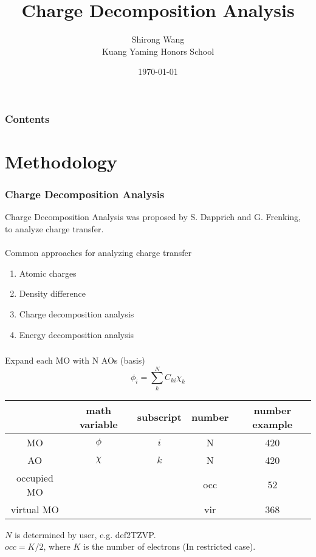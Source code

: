 \documentclass[10pt,aspectratio=43]{beamer}
\title{Charge Decomposition Analysis}	        %
\author[]{            %
    Shirong Wang\\[0.3cm]
    Kuang Yaming Honors School}
\date{\today}
\newcommand{\code}[1]{\colorbox{codegray}{{\Consolas#1}}}
\numberwithin{equation}{section}
\begin{document}
\begin{frame}
\titlepage
\end{frame}

\begin{frame}
\frametitle{Contents}
\tableofcontents
\end{frame}

\section{Methodology}
\begin{frame}
\frametitle{Charge Decomposition Analysis}
Charge Decomposition Analysis was proposed by S. Dapprich and G. Frenking, to analyze charge transfer.\\
\hfill {}
~\vspace{40pt}\\
Common approaches for analyzing charge transfer
\begin{enumerate}
	\item Atomic charges
	\item Density difference
	\item Charge decomposition analysis
	\item Energy decomposition analysis
\end{enumerate}
\end{frame}

\begin{frame}
\frametitle{}
Expand each MO with N AOs (basis)
\begin{equation}\label{key}
\phi_i = \sum_k^N C_{ki}\chi_k
\end{equation}
\begin{table}
	\centering
	\begin{tabular}{ccccc}
		\hline
		& math variable & subscript & number & number example\\ \hline
		MO & $ \phi $ & $ i $ & N & 420\\
		AO & $ \chi $ & $ k $ & N & 420\\
		occupied MO &   &   &   occ & 52\\
		virtual MO &   &     &  vir & 368\\
		\hline
	\end{tabular}
\end{table}
$ N $ is determined by user, e.g. \code{def2TZVP}.\\
$ occ = K/2 $, where $ K $ is the number of electrons (In restricted case).\\

\end{frame}
\end{document}
